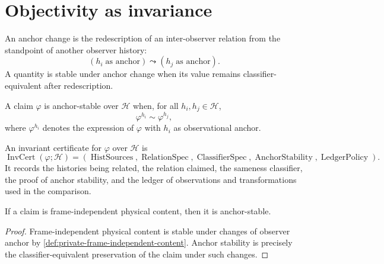 \section{Objectivity as invariance}
\label{sec:objectivity-as-invariance}

\begin{definition}
\label{def:anchor-change}
An anchor change is the redescription of an inter-observer relation from the standpoint of another observer history:
$$
(h_i\;\text{as anchor})
\leadsto
(h_j\;\text{as anchor}).
$$
A quantity is stable under anchor change when its value remains classifier-equivalent after redescription.
\end{definition}

\begin{definition}
\label{def:anchor-stable-claim}
A claim $\varphi$ is anchor-stable over $\mathcal H$ when, for all $h_i,h_j\in\mathcal H$,
$$
\varphi^{h_i}\sim\varphi^{h_j},
$$
where $\varphi^{h_i}$ denotes the expression of $\varphi$ with $h_i$ as observational anchor.
\end{definition}

\begin{definition}
\label{def:invariant-certificate}
An invariant certificate for $\varphi$ over $\mathcal H$ is
$$
\operatorname{InvCert}(\varphi;\mathcal H)
=
(\operatorname{HistSources},
\operatorname{RelationSpec},
\operatorname{ClassifierSpec},
\operatorname{AnchorStability},
\operatorname{LedgerPolicy}).
$$
It records the histories being related, the relation claimed, the sameness classifier, the proof of anchor stability, and the ledger of observations and transformations used in the comparison.
\end{definition}

\begin{theorem}
\label{thm:objectivity-requires-anchor-stability}
If a claim is frame-independent physical content, then it is anchor-stable.
\end{theorem}

\begin{proof}
Frame-independent physical content is stable under changes of observer anchor by \autoref{def:private-frame-independent-content}. Anchor stability is precisely the classifier-equivalent preservation of the claim under such changes.
\end{proof}

